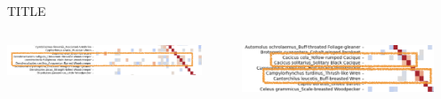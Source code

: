 \begin{frame}{TITLE}
    \begin{columns}
        \begin{column}{0.5\textwidth}
            \centering
            \includegraphics[height=0.9\textheight,width=0.9\textwidth,keepaspectratio]{images/sim1.png}   
        \end{column}
        \begin{column}{0.5\textwidth}
            \centering
            \includegraphics[height=0.9\textheight,width=0.9\textwidth,keepaspectratio]{images/sim2.png} 
        \end{column}
    \end{columns}
\end{frame}





